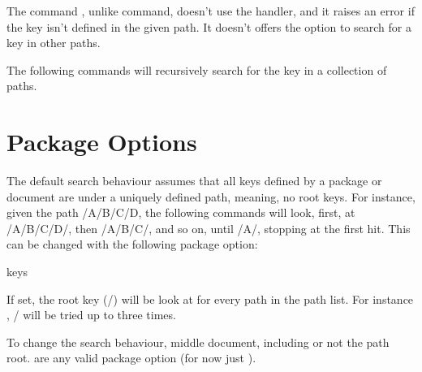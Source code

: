 \documentclass[10pt]{article}
\begin{document}
  
\begin{typesetabstract}

The command \tsobj{\pgfkeysvalueof}, unlike \tsobj{\pgfkeys} command, doesn't use the  handler, and it raises an error if the key isn't defined in the given path. It doesn't offers the option to search for a key in other paths.

The following commands will recursively search for the key in a collection of paths.
\end{typesetabstract}

\tableofcontents

\section{Package Options}\label{Pack-Options}
The default search behaviour assumes that all keys defined by a package or document are under a uniquely defined path, meaning, no root keys. For instance, given the path /A/B/C/D, the following commands will look, first, at /A/B/C/D/, then /A/B/C/, and so on, until /A/, stopping at the first hit. This can be changed with the following package option:

\begin{describelist*}{keys}
\end{describelist*}
\begin{tsremark}
  If set, the root key (/) will be look at for every path in the path list. For instance , / will be tried up to three times.
\end{tsremark}


\begin{codedescribe}[code,new=2025/05/27]{\pgfkeysearchsettings}
\begin{codesyntax}%
\end{codesyntax}
To change the search behaviour, middle document, including or not the path root.  are any valid package option (for now just ).
\end{codedescribe}
\end{document}
